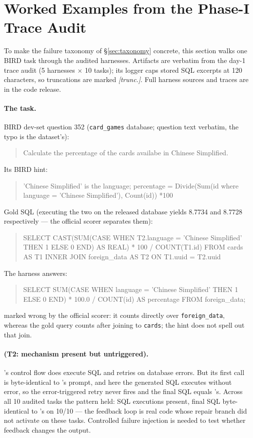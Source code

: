 \section{Worked Examples from the Phase-I Trace Audit}\label{app:examples}

To make the failure taxonomy of \S\ref{sec:taxonomy} concrete, this section
walks one BIRD task through the audited harnesses. Artifacts are verbatim
from the day-1 trace audit (5 harnesses $\times$ 10 tasks); its logger caps
stored SQL excerpts at 120 characters, so truncations are marked
\emph{[trunc.]}. Full harness sources and traces are in the code release.

\paragraph{The task.} BIRD dev-set question 352 (\texttt{card\_games}
database; question text verbatim, the typo is the dataset's):
\begin{quote}\small\ttfamily
Calculate the percentage of the cards availabe in Chinese Simplified.
\end{quote}
Its BIRD hint:
\begin{quote}\small\ttfamily
'Chinese Simplified' is the language; percentage = Divide(Sum(id where
language = 'Chinese Simplified'), Count(id)) *100
\end{quote}
Gold SQL (executing the two on the released database yields 8.7734 and
8.7728 respectively --- the official scorer separates them):
\begin{quote}\small\ttfamily
SELECT CAST(SUM(CASE WHEN T2.language = 'Chinese Simplified' THEN 1 ELSE 0
END) AS REAL) * 100 / COUNT(T1.id) FROM cards AS T1 INNER JOIN foreign\_data
AS T2 ON T1.uuid = T2.uuid
\end{quote}
The \bare{} harness answers:
\begin{quote}\small\ttfamily
SELECT SUM(CASE WHEN language = 'Chinese Simplified' THEN 1 ELSE 0 END) *
100.0 / COUNT(id) AS percentage FROM foreign\_data;
\end{quote}
marked wrong by the official scorer: it counts directly over
\texttt{foreign\_data}, whereas the gold query counts after joining to
\texttt{cards}; the hint does not spell out that join.

\paragraph{\react{} (T2: mechanism present but untriggered).} \react's control
flow does execute SQL and retries on database errors. But its first call is
byte-identical to \bare's prompt, and here the generated SQL executes without
error, so the error-triggered retry never fires and the final SQL equals
\bare's. Across all 10 audited tasks the pattern held: SQL executions
present, final SQL byte-identical to \bare's on 10/10 --- the feedback loop
is real code whose repair branch did not activate on these tasks. Controlled
failure injection is needed to test whether feedback changes the output.

